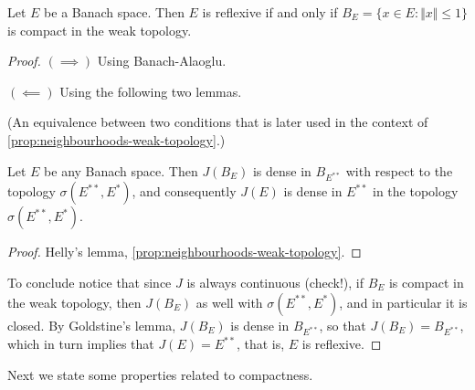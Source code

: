 \documentclass{article}
\theoremstyle{definition}
\numberwithin{equation}{section}
\begin{document}
	\begin{thm}[Kakutani]
		Let $E$ be a Banach space. Then $E$ is reflexive if and only if $B_E=\{x\in E:\Vert x\Vert\leq1\}$ is compact in the weak topology.
	\end{thm}
	\begin{proof}\leavevmode
		
		$(\implies)$ Using Banach-Alaoglu.
		
		$(\impliedby)$ Using the following two lemmas.
		\begin{lemma}[Helly]
			(An equivalence between two conditions that is later used in the context of \cref{prop:neighbourhoods-weak-topology}.)
		\end{lemma}
		\begin{lemma}[Goldstine]
			Let $E$ be any Banach space. Then $J(B_E)$ is dense in $B_{E^{**}}$ with respect to the topology $\sigma(E^{**},E^*)$, and consequently $J(E)$ is dense in $E^{**}$ in the topology $\sigma(E^{**},E^*)$.
		\end{lemma}
		\begin{proof}
			Helly's lemma, \cref{prop:neighbourhoods-weak-topology}.
		\end{proof}
		
		To conclude notice that since $J$ is always continuous (check!), if $B_E$ is compact in the weak topology, then $J(B_E)$ as well with $\sigma(E^{**},E^*)$, and in particular it is closed. By Goldstine's lemma, $J(B_E)$ is dense in $B_{E^{**}}$, so that $J(B_E)=B_{E^{**}}$, which in turn implies that $J(E)=E^{**}$, that is, $E$ is reflexive.
	\end{proof}
	
	Next we state some properties related to compactness.
	
\end{document}
